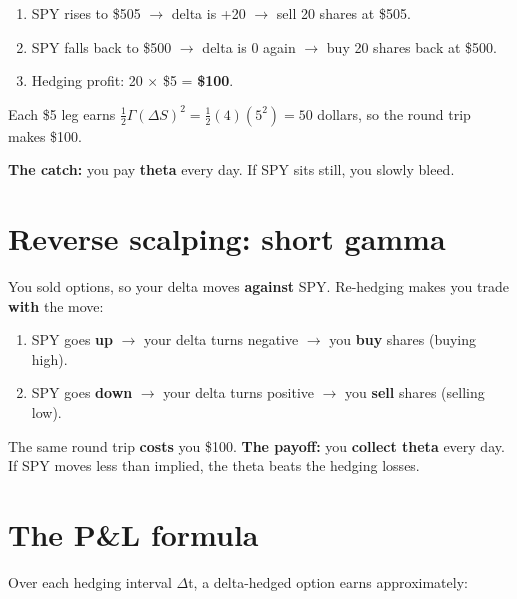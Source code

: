 \documentclass{article}
\begin{document}
\begin{enumerate}

\item SPY rises to \$505 \ensuremath{\rightarrow} delta is +20 \ensuremath{\rightarrow} sell 20 shares at \$505.

\item SPY falls back to \$500 \ensuremath{\rightarrow} delta is 0 again \ensuremath{\rightarrow} buy 20 shares back at \$500.

\item Hedging profit: 20 \ensuremath{\times} \$5 = \textbf{\$100}.

\end{enumerate}

Each \$5 leg earns $\tfrac{1}{2}\Gamma (\Delta S)^2 = \tfrac{1}{2}(4)(5^2) = 50$ dollars, so the round trip makes \$100.

\textbf{The catch:} you pay \textbf{theta} every day. If SPY sits still, you slowly bleed.

\section{Reverse scalping: short gamma}

You sold options, so your delta moves \textbf{against} SPY. Re-hedging makes you trade \textbf{with} the move:

\begin{enumerate}

\item SPY goes \textbf{up} \ensuremath{\rightarrow} your delta turns negative \ensuremath{\rightarrow} you \textbf{buy} shares (buying high).

\item SPY goes \textbf{down} \ensuremath{\rightarrow} your delta turns positive \ensuremath{\rightarrow} you \textbf{sell} shares (selling low).

\end{enumerate}

The same round trip \textbf{costs} you \$100. \textbf{The payoff:} you \textbf{collect theta} every day. If SPY moves less than implied, the theta beats the hedging losses.

\section{The P\&L formula}

Over each hedging interval \ensuremath{\Delta}t, a delta-hedged option earns approximately:
\end{document}

